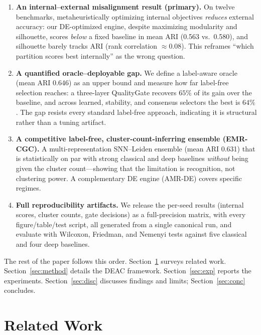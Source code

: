 \documentclass[journal]{IEEEtran}
\begin{document}
\begin{enumerate}
\item \textbf{An internal--external misalignment result (primary).} On twelve
benchmarks, metaheuristically optimizing internal objectives \emph{reduces}
external accuracy: our DE-optimized engine, despite maximizing modularity and
silhouette, scores \emph{below} a fixed baseline in mean ARI (0.563 vs.\ 0.580),
and silhouette barely tracks ARI (rank correlation ${\approx}0.08$). This
reframes ``which partition scores best internally'' as the wrong question.

\item \textbf{A quantified oracle--deployable gap.} We define a label-aware
oracle (mean ARI 0.646) as an upper bound and measure how far label-free
selection reaches: a three-layer QualityGate recovers $65\%$ of its gain over
the baseline, and across learned, stability, and consensus selectors the best
is $64\%$. The gap resists every standard label-free approach, indicating it is
structural rather than a tuning artifact.

\item \textbf{A competitive label-free, cluster-count-inferring ensemble
(EMR-CGC).} A multi-representation SNN--Leiden ensemble (mean ARI 0.631) that is
statistically on par with strong classical and deep baselines \emph{without}
being given the cluster count---showing that the limitation is recognition, not
clustering power. A complementary DE engine (AMR-DE) covers specific regimes.

\item \textbf{Full reproducibility artifacts.} We release the per-seed results
(internal scores, cluster counts, gate decisions) as a full-precision matrix, with
every figure/table/test script, all generated from a single canonical run, and
evaluate with Wilcoxon, Friedman, and Nemenyi tests against five classical and four
deep baselines.
\end{enumerate}

The rest of the paper follows this order. Section~\ref{sec:related} surveys related work. Section~\ref{sec:method} details the DEAC framework. Section~\ref{sec:exp} reports the experiments. Section~\ref{sec:disc} discusses findings and limits; Section~\ref{sec:conc} concludes.

\section{Related Work}\label{sec:related}
\end{document}
